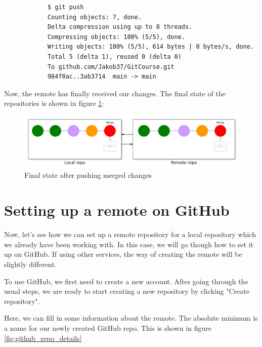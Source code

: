 \documentclass[../main/git_course_main.tex]{subfiles}
\begin{document}
	\begin{codebox}
		\begin{lstlisting}
			$ git push
			Counting objects: 7, done.
			Delta compression using up to 8 threads.
			Compressing objects: 100% (5/5), done.
			Writing objects: 100% (5/5), 614 bytes | 0 bytes/s, done.
			Total 5 (delta 1), reused 0 (delta 0)
			To github.com/Jakob37/GitCourse.git
			984f0ac..3ab3714  main -> main
		\end{lstlisting}
	\end{codebox}
	
	Now, the remote has finally received our changes. The final state of the repositories is shown in figure \ref{fig:pushing_merged_commits}:
	
	\begin{figure}[h!]
		\centering
		\includegraphics[width=1.0\textwidth]{../visualizations/chapter5/57_pushing_merged_commits.pdf}
		\caption{Final state after pushing merged changes}
		\label{fig:pushing_merged_commits}
	\end{figure}
	
	\section{Setting up a remote on GitHub}
	
	Now, let's see how we can set up a remote repository for a local repository which we already have been working with.
	In this case, we will go though how to set it up on GitHub. If using other services, the way of creating the remote will be slightly different.
	
	To use GitHub, we first need to create a new account. After going through the usual steps, we are ready to start creating a new repository by clicking "Create repository".
	
	Here, we can fill in some information about the remote. The absolute minimum is a name for our newly created GitHub repo. This is shown in figure \ref{fig:github_repo_details}
	
\end{document}

